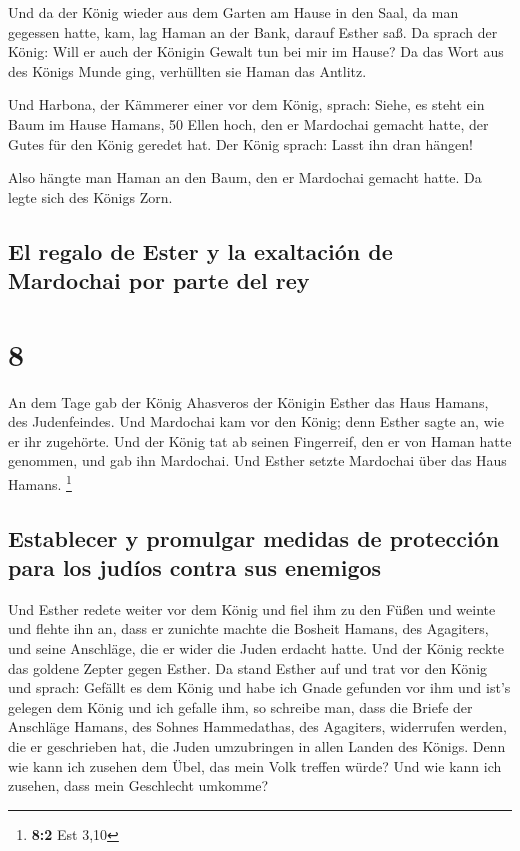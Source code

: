  Und da der König wieder aus dem Garten am Hause in den
Saal, da man gegessen hatte, kam, lag Haman an der Bank, darauf Esther
saß. Da sprach der König: Will er auch der Königin Gewalt tun bei mir im
Hause? Da das Wort aus des Königs Munde ging, verhüllten sie Haman das
Antlitz.

 Und Harbona, der Kämmerer einer vor dem König, sprach:
Siehe, es steht ein Baum im Hause Hamans, 50 Ellen hoch, den er
Mardochai gemacht hatte, der Gutes für den König geredet hat. Der König
sprach: Lasst ihn dran hängen!

 Also hängte man Haman an den Baum, den er Mardochai
gemacht hatte. Da legte sich des Königs Zorn.

\hypertarget{el-regalo-de-ester-y-la-exaltaciuxf3n-de-mardochai-por-parte-del-rey}{%
\subsection{El regalo de Ester y la exaltación de Mardochai por parte
del
rey}\label{el-regalo-de-ester-y-la-exaltaciuxf3n-de-mardochai-por-parte-del-rey}}

\hypertarget{section-7}{%
\section{8}\label{section-7}}

 An dem Tage gab der König Ahasveros der Königin Esther
das Haus Hamans, des Judenfeindes. Und Mardochai kam vor den König; denn
Esther sagte an, wie er ihr zugehörte.  Und der König tat
ab seinen Fingerreif, den er von Haman hatte genommen, und gab ihn
Mardochai. Und Esther setzte Mardochai über das Haus Hamans. \footnote{\textbf{8:2}
  Est 3,10}

\hypertarget{establecer-y-promulgar-medidas-de-protecciuxf3n-para-los-juduxedos-contra-sus-enemigos}{%
\subsection{Establecer y promulgar medidas de protección para los judíos
contra sus
enemigos}\label{establecer-y-promulgar-medidas-de-protecciuxf3n-para-los-juduxedos-contra-sus-enemigos}}

 Und Esther redete weiter vor dem König und fiel ihm zu
den Füßen und weinte und flehte ihn an, dass er zunichte machte die
Bosheit Hamans, des Agagiters, und seine Anschläge, die er wider die
Juden erdacht hatte.  Und der König reckte das goldene
Zepter gegen Esther. Da stand Esther auf und trat vor den König
 und sprach: Gefällt es dem König und habe ich Gnade
gefunden vor ihm und ist's gelegen dem König und ich gefalle ihm, so
schreibe man, dass die Briefe der Anschläge Hamans, des Sohnes
Hammedathas, des Agagiters, widerrufen werden, die er geschrieben hat,
die Juden umzubringen in allen Landen des Königs.  Denn
wie kann ich zusehen dem Übel, das mein Volk treffen würde? Und wie kann
ich zusehen, dass mein Geschlecht umkomme?

